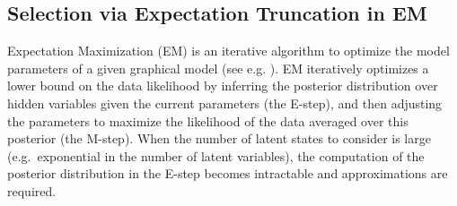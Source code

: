 \subsection{Selection via Expectation Truncation in EM}
Expectation Maximization (EM) is an iterative algorithm to optimize the model parameters of a given graphical model (see e.g. \citep{DempsterEtAl1977, NealHinton1998}).
EM iteratively optimizes a lower bound on the data likelihood by inferring the
posterior distribution over hidden variables given the current parameters (the
E-step), and then adjusting the parameters to maximize the likelihood of the
data averaged over this posterior (the M-step).
%
When the number of latent states to consider is large (e.g.\ exponential in the
number of latent variables), the computation of the posterior distribution in
the E-step becomes intractable and approximations are required.


